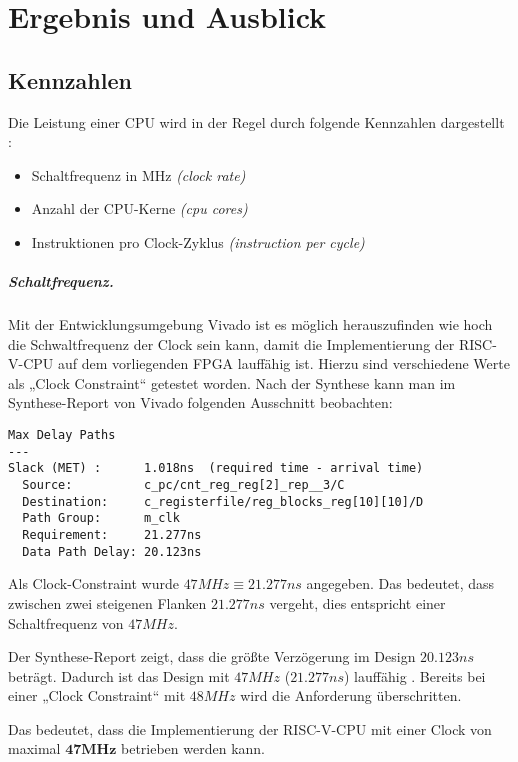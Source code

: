 \chapter{Ergebnis und Ausblick} %
\label{Ergebnis} %

\section{Kennzahlen}
Die Leistung einer CPU wird in der Regel durch folgende Kennzahlen
dargestellt \cite[S. 43]{Hennessy}:
\begin{itemize}
    \item Schaltfrequenz in MHz \emph{(clock rate)}
    \item Anzahl der CPU-Kerne \emph{(cpu cores)}
    \item Instruktionen pro Clock-Zyklus \emph{(instruction per cycle)} 
\end{itemize}

\paragraph{Schaltfrequenz.} Mit der Entwicklungsumgebung Vivado ist es
möglich herauszufinden wie hoch die Schwaltfrequenz der Clock sein kann,
damit die Implementierung der RISC-V-CPU auf dem vorliegenden FPGA
lauffähig ist. Hierzu sind verschiedene Werte als „Clock Constraint“
getestet worden. Nach der Synthese kann man im Synthese-Report von
Vivado folgenden Ausschnitt beobachten: 
\begin{lstlisting}
Max Delay Paths
---
Slack (MET) :      1.018ns  (required time - arrival time)
  Source:          c_pc/cnt_reg_reg[2]_rep__3/C
  Destination:     c_registerfile/reg_blocks_reg[10][10]/D
  Path Group:      m_clk
  Requirement:     21.277ns  
  Data Path Delay: 20.123ns  
\end{lstlisting}
Als Clock-Constraint wurde $47 MHz \equiv 21.277ns$ angegeben.
Das bedeutet, dass zwischen zwei steigenen Flanken $21.277ns$ vergeht,
dies entspricht einer Schaltfrequenz von $47 MHz$.

Der Synthese-Report zeigt, dass die größte Verzögerung im Design
$20.123ns$ beträgt. Dadurch ist das Design mit $47 MHz$ ($21.277ns$) lauffähig 
.
Bereits bei einer „Clock Constraint“ mit $48 MHz$ wird die Anforderung
überschritten.

Das bedeutet, dass die Implementierung der RISC-V-CPU mit einer Clock
von maximal $\mathbf{47 MHz}$ betrieben werden kann.

